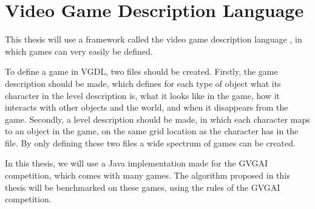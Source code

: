 \section{Video Game Description Language}
\label{subsec:vgdl}
This thesis will use a framework called the video game description
language \cite{schaul2013video}, in which games can very easily be defined.

To define a game in VGDL, two files should be created. Firstly, the game
description should be made, which defines for each type of object what its
character in the level description is, what it looks like in the game, how it
interacts with other objects and the world, and when it disappears from the
game. Secondly, a level description should be made, in which each character maps
to an object in the game, on the same grid location as the character has in the
file. By only defining these two files a wide spectrum of games can be created.

In this thesis, we will use a Java implementation made for the GVGAI competition,
which comes with many games. The algorithm proposed in this thesis will be
benchmarked on these games, using the rules of the GVGAI competition. 

